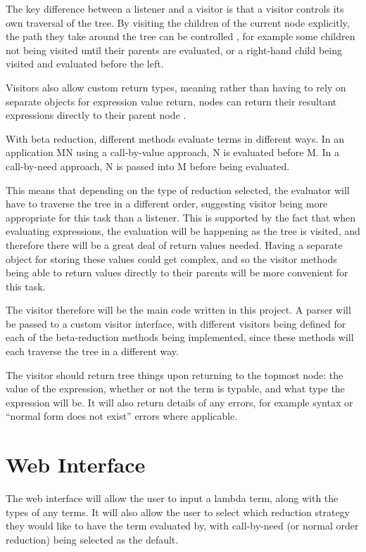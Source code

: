\documentclass[a4paper,12pt]{report}
\begin{document}
The key difference between a listener and a visitor is that a visitor controls its own traversal of the tree. By visiting the children of the current node explicitly, the path they take around the tree can be controlled \cite{Parr2012}, for example some children not being visited until their parents are evaluated, or a right-hand child being visited and evaluated before the left.

Visitors also allow custom return types, meaning rather than having to rely on separate objects for expression value return, nodes can return their resultant expressions directly to their parent node \cite{Srivastav2017}.

With beta reduction, different methods evaluate terms in different ways. In an application MN using a call-by-value approach, N is evaluated before M. In a call-by-need approach, N is passed into M before being evaluated.

This means that depending on the type of reduction selected, the evaluator will have to traverse the tree in a different order, suggesting visitor being more appropriate for this task than a listener. This is supported by the fact that when evaluating expressions, the evaluation will be happening as the tree is visited, and therefore there will be a great deal of return values needed. Having a separate object for storing these values could get complex, and so the visitor methods being able to return values directly to their parents will be more convenient for this task.

The visitor therefore will be the main code written in this project. A parser will be passed to a custom visitor interface, with different visitors being defined for each of the beta-reduction methods being implemented, since these methods will each traverse the tree in a different way.

The visitor should return tree things upon returning to the topmost node: the value of the expression, whether or not the term is typable, and what type the expression will be. It will also return details of any errors, for example syntax or “normal form does not exist” errors where applicable.

\section{Web Interface}

The web interface will allow the user to input a lambda term, along with the types of any terms. It will also allow the user to select which reduction strategy they would like to have the term evaluated by, with call-by-need (or normal order reduction) being selected as the default.
\end{document}
